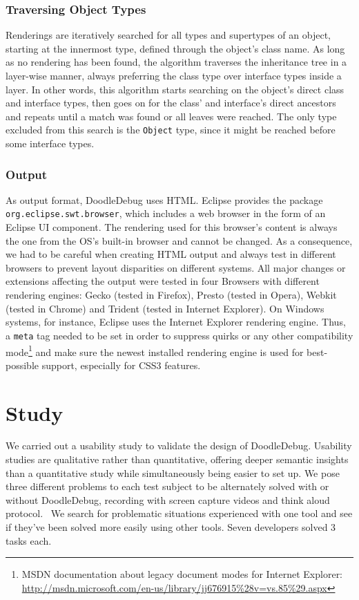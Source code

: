\documentclass[english]{scrartcl}
\newcommand{\DD}{Dood\-le\-De\-bug\xspace}
\begin{document}
\subsubsection{Traversing Object Types}
Renderings are iteratively searched for all types and supertypes of an object, starting at the innermost type, defined through the object's class name.
As long as no rendering has been found, the algorithm traverses the inheritance tree in a layer-wise manner, always preferring the class type over interface types inside a layer.
In other words, this algorithm starts searching on the object's direct class and interface types, then goes on for the class' and interface's direct ancestors and repeats until a match was found or all leaves were reached.
The only type excluded from this search is the \texttt{Object} type, since it might be reached before some interface types.

\subsubsection{Output}
As output format, \DD uses HTML.
Eclipse provides the package \texttt{org.eclipse.swt.browser}, which includes a web browser in the form of an Eclipse UI component.
The rendering used for this browser's content is always the one from the OS's built-in browser and cannot be changed.
As a consequence, we had to be careful when creating HTML output and always test in different browsers to prevent layout disparities on different systems.
All major changes or extensions affecting the output were tested in four Browsers with different rendering engines: Gecko (tested in Firefox), Presto (tested in Opera), Webkit (tested in Chrome) and Trident (tested in Internet Explorer).
On Windows systems, for instance, Eclipse uses the Internet Explorer rendering engine.
Thus, a \texttt{meta} tag needed to be set in order to suppress quirks or any other compatibility mode\footnote{MSDN documentation about legacy document modes for Internet Explorer: \url{http://msdn.microsoft.com/en-us/library/jj676915\%28v=vs.85\%29.aspx}} and make sure the newest installed rendering engine is used for best-possible support, especially for CSS3 features.


\section{Study}

We carried out a usability study \cite{Krug00a} to validate the design of \DD.
Usability studies are qualitative rather than quantitative, offering deeper semantic insights~\cite[pp. 13--15]{Lang09b} than a quantitative study while simultaneously being easier to set up.
We pose three different problems to each test subject to be alternately solved with or without \DD, recording with screen capture videos and think aloud protocol.~\cite{Krug00a,Lang09b}
We search for problematic situations experienced with one tool and see if they've been solved more easily using other tools.
Seven developers solved 3 tasks each.
\end{document}
